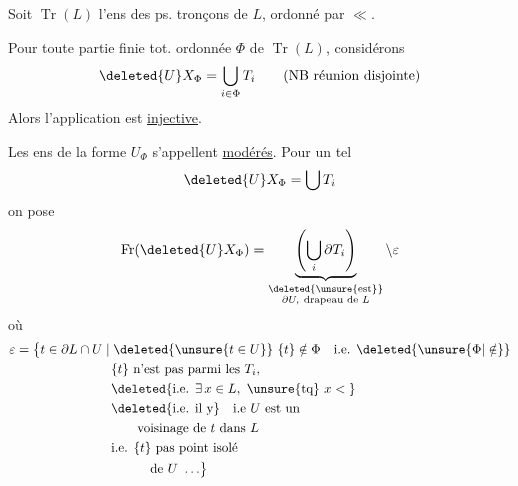 
Soit $\operatorname{Tr}(L)$ l'ens  des ps. tronçons de $L$, ordonné par $\ll$.

Pour toute partie finie tot. ordonnée $\Phi$ de $\operatorname{Tr}(L)$, considérons
\[
\deleted{U}X_{\Phi}=\bigcup_{i\in\Phi}T_i\qquad\text{(NB réunion disjointe)}
\]
Alors l'application
est \uline{injective}.

Les ens de la forme $U_{\Phi}$ s'appellent \uline{modérés}. Pour un tel
\[
\deleted{U}X_{\Phi}=\bigcup T_i
\]
on pose
\[
\operatorname{Fr}(\deleted{U}X_{\Phi})=
\underbrace{\left(\bigcup_i\partial T_i\right)}_{\substack{\deleted{\text{\unsure{est}}}\\\partial U,\ \text{drapeau de } L}}\setminus\varepsilon
\]
où
\[
\begin{aligned}
\varepsilon={}&\bigl\{t\in\partial L\cap U\mid
  \deleted{\unsure{t\in U}}\ \{t\}\notin\Phi\quad\text{i.e. }\deleted{\unsure{\Phi|\notin}}\\
&\hspace{6em}\{t\}\text{ n'est pas parmi les }T_i,\\
&\hspace{6em}\deleted{\text{i.e. }\exists\,x\in L,\ \text{\unsure{tq} } x<{}}\\
&\hspace{6em}\deleted{\text{i.e. il y}}\quad\text{i.e }U\text{ est un}\\
&\hspace{8em}\text{voisinage de }t\text{ dans } L\\
&\hspace{6em}\text{i.e. }\{t\}\text{ pas point isolé}\\
&\hspace{9em}\text{de }U\ \ldots\bigr\}
\end{aligned}
\]
